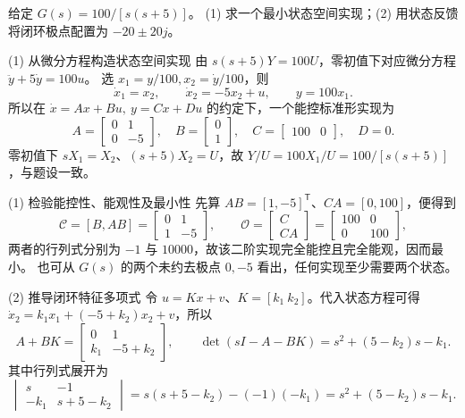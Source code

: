 \documentclass[11pt]{article}
\begin{document}
\begin{problem}[原题 10]
给定 $G(s)=100/[s(s+5)]$。
(1) 求一个最小状态空间实现；(2) 用状态反馈将闭环极点配置为 $-20\pm20j$。
\end{problem}
\begin{solution}
\begin{proofstep}{(1) 从微分方程构造状态空间实现}
由 $s(s+5)Y=100U$，零初值下对应微分方程 $\ddot y+5\dot y=100u$。
选 $x_1=y/100,x_2=\dot y/100$，则
\[
\dot x_1=x_2,\qquad \dot x_2=-5x_2+u,\qquad y=100x_1.
\]
所以在 $\dot x=Ax+Bu,\ y=Cx+Du$ 的约定下，一个能控标准形实现为
\[
\boxed{A=\begin{bmatrix}0&1\\0&-5\end{bmatrix},\quad
B=\begin{bmatrix}0\\1\end{bmatrix},\quad C=\begin{bmatrix}100&0\end{bmatrix},\quad D=0.}
\]
零初值下 $sX_1=X_2$、$(s+5)X_2=U$，故
$Y/U=100X_1/U=100/[s(s+5)]$，与题设一致。
\end{proofstep}

\begin{proofstep}{(1) 检验能控性、能观性及最小性}
先算 $AB=[1,-5]^{\mathsf T}$、$CA=[0,100]$，便得到
\[
\mathcal C=[B,AB]=\begin{bmatrix}0&1\\1&-5\end{bmatrix},\qquad
\mathcal O=\begin{bmatrix}C\\CA\end{bmatrix}=\begin{bmatrix}100&0\\0&100\end{bmatrix},
\]
两者的行列式分别为 $-1$ 与 $10000$，故该二阶实现完全能控且完全能观，因而最小。
也可从 $G(s)$ 的两个未约去极点 $0,-5$ 看出，任何实现至少需要两个状态。
\end{proofstep}

\begin{proofstep}{(2) 推导闭环特征多项式}
令 $u=Kx+v$、$K=[k_1\ k_2]$。代入状态方程可得
$\dot x_2=k_1x_1+(-5+k_2)x_2+v$，所以
\[
A+BK=\begin{bmatrix}0&1\\k_1&-5+k_2\end{bmatrix},\qquad
\det(sI-A-BK)=s^2+(5-k_2)s-k_1.
\]
其中行列式展开为
\[
\begin{vmatrix}s&-1\\-k_1&s+5-k_2\end{vmatrix}
=s(s+5-k_2)-(-1)(-k_1)
=s^2+(5-k_2)s-k_1.
\]
\end{proofstep}


\end{solution}
\end{document}
